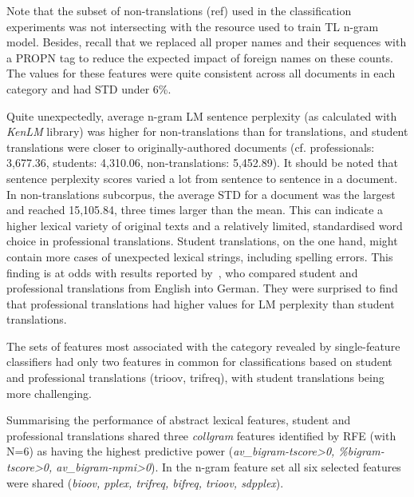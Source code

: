 Note that the subset of non-translations (ref) used in the classification experiments was not intersecting with the resource used to train TL n-gram model. Besides, recall that we replaced all proper names and their sequences with a PROPN tag to reduce the expected impact of foreign names on these counts.
The values for these features were quite consistent across all documents in each category and had STD under 6\%.

%
\label{pg:stu_more_surprising_than_pro}
Quite unexpectedly, average n-gram LM sentence perplexity (as calculated with \textit{KenLM} library) was higher for non-translations than for translations, and student translations were closer to originally-authored documents (cf. professionals: 3,677.36, students: 4,310.06, non-translations: 5,452.89). It should be noted that sentence perplexity scores varied a lot from sentence to sentence in a document. In non-translations subcorpus, the average STD for a document was the largest and reached 15,105.84, three times larger than the mean.
This can indicate a higher lexical variety of original texts and a relatively limited, standardised word choice in professional translations. Student translations, on the one hand, might contain more cases of unexpected lexical strings, including spelling errors. 
This finding is at odds with results reported by~\cite{Bizzoni2021}, who compared student and professional translations from English into German. They were surprised to find that professional translations had higher values for LM perplexity than student translations.

The sets of features most associated with the category revealed by single-feature classifiers had only two features in common for classifications based on student and professional translations (trioov, trifreq), with student translations being more challenging.

Summarising the performance of abstract lexical features, student and professional translations shared three \textit{collgram} features identified by RFE (with N=6) as having the highest predictive power (\textit{av\_bigram-tscore>0, \%bigram-tscore>0, av\_bigram-npmi>0}). In the n-gram feature set all six selected features were shared (\textit{bioov, pplex, trifreq, bifreq, trioov, sdpplex}). 

